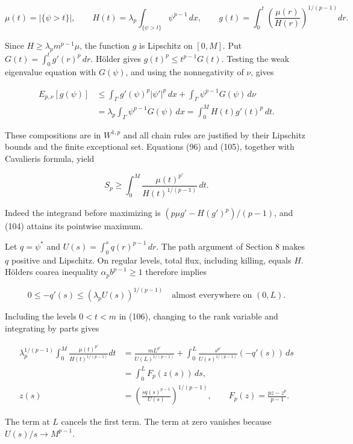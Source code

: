 \documentclass[11pt]{article}
\begin{document}
\[
\mu(t)=|\{\psi>t\}|,
\qquad H(t)=\lambda_p\int_{\{\psi>t\}}\psi^{p-1}\,dx,
\qquad
 g(t)=\int_0^t\left(\frac{\mu(r)}{H(r)}\right)^{1/(p-1)}dr.
\tag{104}
\]

Since \(H\ge\lambda_p m^{p-1}\mu\), the function \(g\) is Lipschitz on
\([0,M]\). Put \(G(t)=\int_0^t g'(r)^p\,dr\). Hölder gives
\(g(t)^p\le t^{p-1}G(t)\). Testing the weak eigenvalue equation with
\(G(\psi)\), and using the nonnegativity of \(\nu\), gives

\[
\begin{aligned}
E_{p,\nu}[g(\psi)]
&\le\int_\Gamma g'(\psi)^p|\psi'|^p\,dx
       +\int_\Gamma\psi^{p-1}G(\psi)\,d\nu\\
&=\lambda_p\int_\Gamma\psi^{p-1}G(\psi)\,dx
 =\int_0^M H(t)g'(t)^p\,dt.
\end{aligned}
\tag{105}
\]

These compositions are in \(W^{1,p}\) and all chain rules are justified
by their Lipschitz bounds and the finite exceptional set. Equations (96)
and (105), together with Cavalieri\textquotesingle s formula, yield

\[
S_p\ge\int_0^M\frac{\mu(t)^{p'}}{H(t)^{1/(p-1)}}\,dt.
\tag{106}
\]

Indeed the integrand before maximizing is \((p\mu g'-H(g')^p)/(p-1)\),
and (104) attains its pointwise maximum.

Let \(q=\psi^*\) and \(U(s)=\int_0^s q(r)^{p-1}\,dr\). The path argument
of Section 8 makes \(q\) positive and Lipschitz. On regular levels,
total flux, including killing, equals \(H\). Hölder\textquotesingle s
coarea inequality \(\alpha_pb^{p-1}\ge1\) therefore implies

\[
0\le-q'(s)\le(\lambda_p U(s))^{1/(p-1)}
\quad\text{almost everywhere on }(0,L).
\tag{107}
\]

Including the levels \(0<t<m\) in (106), changing to the rank variable
and integrating by parts gives

\[
\begin{aligned}
\lambda_p^{1/(p-1)}
 \int_0^M\frac{\mu(t)^{p'}}{H(t)^{1/(p-1)}}dt
&=\frac{mL^{p'}}{U(L)^{1/(p-1)}}
 +\int_0^L\frac{s^{p'}}{U(s)^{1/(p-1)}}(-q'(s))\,ds\\
&=\int_0^L F_p(z(s))\,ds,\\
z(s)&=\left(\frac{s q(s)^{p-1}}{U(s)}\right)^{1/(p-1)},
\qquad F_p(z)=\frac{pz-z^p}{p-1}.
\end{aligned}
\tag{108}
\]

The term at \(L\) cancels the first term. The term at zero vanishes
because \(U(s)/s\to M^{p-1}\).
\end{document}
